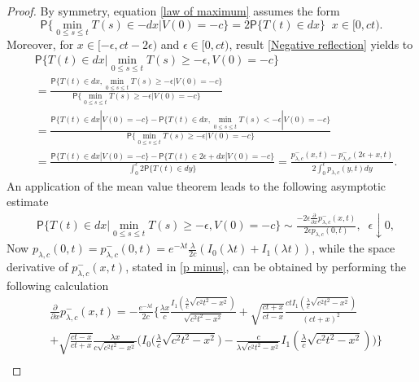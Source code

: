 \documentclass{article}
\theoremstyle{definition}
\numberwithin{equation}{section}
\begin{document}
\begin{proof}
By symmetry, equation \eqref{law of maximum} assumes the form 
\begin{equation*}
\mathsf{P}\{\min_{0\leq s \leq t} T(s) \in -dx|V(0) = -c\} = 2\mathsf{P}\{T(t) \in dx\} \;\; x \in [0,ct).
\end{equation*} 
Moreover, for $x \in [-\epsilon,ct-2\epsilon)$ and $\epsilon \in [0,ct)$, result \eqref{Negative reflection} yields to
\begin{align*}
&\mathsf{P}\{T(t) \in dx | \min_{0\leq s \leq t} T(s) \geq -\epsilon,V(0) = -c\}\\&=\frac{\mathsf{P}\{T(t) \in dx, \min_{0\leq s \leq t} T(s) \geq -\epsilon |V(0) = -c\}}{\mathsf{P}\{\min_{0\leq s \leq t} T(s) \geq - \epsilon|V(0) = -c\}}\\
&=\frac{\mathsf{P}\{T(t) \in dx|V(0) = -c\}-\mathsf{P}\{T(t) \in dx, \min_{0\leq s \leq t} T(s) < -\epsilon |V(0) = -c\}}{\mathsf{P}\{\min_{0\leq s \leq t} T(s) \geq - \epsilon|V(0) = -c\}} \\
&=\frac{\mathsf{P}\{T(t) \in dx|V(0) = -c\}-\mathsf{P}\{T(t) \in 2\epsilon+dx|V(0) = -c\}}{\int_{0}^{\epsilon} 2 \mathsf{P}\{T(t) \in dy\}} = \frac{p^{-}_{\lambda,c}(x,t)-p^{-}_{\lambda,c}(2\epsilon+x,t)}{2\int_0^\epsilon p_{\lambda,c}(y,t)dy}.
\end{align*}
An application of the mean value theorem leads to the following asymptotic estimate
\begin{align}\label{asymptotic estimate formula}
&\mathsf{P}\{T(t) \in dx \lvert \min_{0\leq s \leq t} T(s) \geq -\epsilon,V(0) = -c\} \sim \frac{-2\epsilon \frac{\partial }{\partial x}p^{-}_{\lambda,c}(x,t)}{2\epsilon p_{\lambda,c}(0,t)}, \;\; \epsilon \downarrow 0,
\end{align}
Now $p_{\lambda,c}(0,t) =  p^{-}_{\lambda,c}(0,t) = e^{-\lambda t}\frac{\lambda}{2c}(I_0(\lambda t)+I_1(\lambda t))$, while the space derivative of $p^{-}_{\lambda,c}(x,t)$, stated in \eqref{p minus}, can be obtained by performing the following calculation
\begin{align}\label{proof limit telegraph meander 2}
&\frac{\partial}{\partial x}p^{-}_{\lambda,c}(x,t) =-\frac{e^{-\lambda t}}{2c}\bigg\{\frac{\lambda x}{c}\frac{I_1(\frac{\lambda}{c}\sqrt{c^2t^2-x^2})}{\sqrt{c^2t^2-x^2}} + \sqrt{\frac{ct+x}{ct-x}}\frac{ctI_1(\frac{\lambda}{c}\sqrt{c^2t^2-x^2})}{(ct+x)^2} \nonumber\\
&+\sqrt{\frac{ct-x}{ct+x}}\frac{\lambda x}{c\sqrt{c^2t^2-x^2}}\bigg(I_0\big(\frac{\lambda}{c}\sqrt{c^2t^2-x^2}\big) -\frac{c}{\lambda\sqrt{c^2t^2-x^2}}I_1(\frac{\lambda}{c}\sqrt{c^2t^2-x^2}) \bigg)\bigg\} \nonumber\\

\end{align}
\end{proof}
\end{document}
